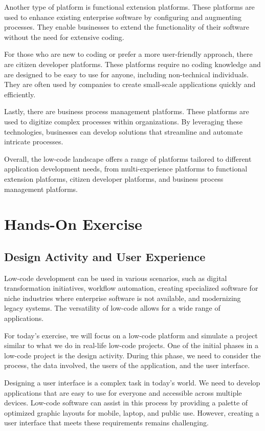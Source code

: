 Another type of platform is functional extension platforms. These
platforms are used to enhance existing enterprise software by
configuring and augmenting processes. They enable businesses to extend
the functionality of their software without the need for extensive
coding.

For those who are new to coding or prefer a more user-friendly approach,
there are citizen developer platforms. These platforms require no coding
knowledge and are designed to be easy to use for anyone, including
non-technical individuals. They are often used by companies to create
small-scale applications quickly and efficiently.

Lastly, there are business process management platforms. These platforms
are used to digitize complex processes within organizations. By
leveraging these technologies, businesses can develop solutions that
streamline and automate intricate processes.

Overall, the low-code landscape offers a range of platforms tailored to
different application development needs, from multi-experience platforms
to functional extension platforms, citizen developer platforms, and
business process management platforms.

\section{Hands-On Exercise}\label{hands-on-exercise}

\subsection{Design Activity and User
    Experience}\label{design-activity-and-user-experience}

Low-code development can be used in various scenarios, such as digital
transformation initiatives, workflow automation, creating specialized
software for niche industries where enterprise software is not
available, and modernizing legacy systems. The versatility of low-code
allows for a wide range of applications.

For today's exercise, we will focus on a low-code platform and simulate
a project similar to what we do in real-life low-code projects. One of
the initial phases in a low-code project is the design activity. During
this phase, we need to consider the process, the data involved, the
users of the application, and the user interface.

Designing a user interface is a complex task in today's world. We need
to develop applications that are easy to use for everyone and accessible
across multiple devices. Low-code software can assist in this process by
providing a palette of optimized graphic layouts for mobile, laptop, and
public use. However, creating a user interface that meets these
requirements remains challenging.


